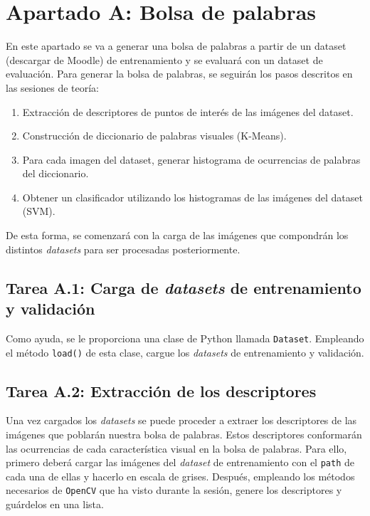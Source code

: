 \chapter{Apartado A: \textbf{Bolsa de palabras}}
\label{chapter:tarea_a}


En este apartado se va a generar una bolsa de palabras a partir de un dataset (descargar de Moodle) de entrenamiento y se evaluará con un dataset de evaluación. Para generar la bolsa de palabras, se seguirán los pasos descritos en las sesiones de teoría:

\begin{enumerate}
    \item Extracción de descriptores de puntos de interés de las imágenes del dataset.
    \item Construcción de diccionario de palabras visuales (K-Means).
    \item Para cada imagen del dataset, generar histograma de ocurrencias de palabras del diccionario.
    \item Obtener un clasificador utilizando los histogramas de las imágenes del dataset (SVM).
\end{enumerate}

De esta forma, se comenzará con la carga de las imágenes que compondrán los distintos \textit{datasets} para ser procesadas posteriormente.

\section*{Tarea A.1: Carga de \textit{datasets} de entrenamiento y validación}

Como ayuda, se le proporciona una clase de Python llamada \texttt{Dataset}. Empleando el método \texttt{load()} de esta clase, cargue los \textit{datasets} de entrenamiento y validación.

\section*{Tarea A.2: Extracción de los descriptores}

Una vez cargados los \textit{datasets} se puede proceder a extraer los descriptores de las imágenes que poblarán nuestra bolsa de palabras. Estos descriptores conformarán las ocurrencias de cada característica visual en la bolsa de palabras. Para ello, primero deberá cargar las imágenes del \textit{dataset} de entrenamiento con el \texttt{path} de cada una de ellas y hacerlo en escala de grises. Después, empleando los métodos necesarios de \texttt{OpenCV} que ha visto durante la sesión, genere los descriptores y guárdelos en una lista.

